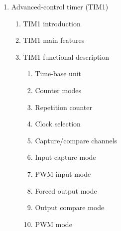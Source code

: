 \documentclass{article}
\begin{document}
\begin{enumerate}
\begin{enumerate}
\begin{enumerate}
            \item ADC watchdog higher threshold register (ADC\_HTR) 
            \item ADC watchdog lower threshold register (ADC\_LTR) 
            \item ADC regular sequence register 1 (ADC\_SQR1) 
            \item ADC regular sequence register 2 (ADC\_SQR2) 
            \item ADC regular sequence register 3 (ADC\_SQR3) 
            \item ADC injected sequence register (ADC\_JSQR) 
            \item ADC injected data register x (ADC\_JDRx) (x= 1..4) 
            \item ADC regular data register (ADC\_DR) 
            \item ADC common control register (ADC\_CCR) 
            \item ADC register map 
        \end{enumerate}
    \end{enumerate}
    \item Advanced-control timer (TIM1) 
    \begin{enumerate}
        \item TIM1 introduction 
        \item TIM1 main features 
        \item TIM1 functional description 
        \begin{enumerate}
            \item Time-base unit 
            \item Counter modes 
            \item Repetition counter 
            \item Clock selection 
            \item Capture/compare channels 
            \item Input capture mode 
            \item PWM input mode 
            \item Forced output mode 
            \item Output compare mode 
            \item PWM mode 

\end{enumerate}
\end{enumerate}
\end{enumerate}
\end{document}
